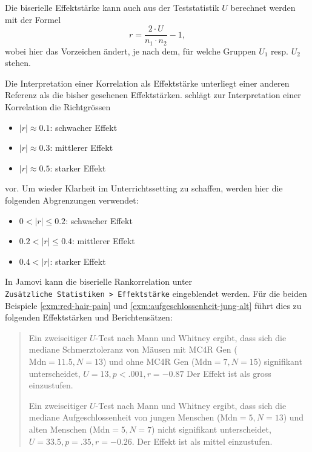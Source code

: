 \documentclass[
]{book}
\providecommand{\tightlist}{%
  \setlength{\itemsep}{0pt}\setlength{\parskip}{0pt}}
\theoremstyle{definition}
\theoremstyle{definition}
\theoremstyle{definition}
\theoremstyle{definition}
\theoremstyle{remark}
\begin{document}
Die biserielle Effektstärke kann auch aus der Teststatistik \(U\)
berechnet werden mit der Formel \[r = \frac{2\cdot U}{n_1\cdot n_2}-1,\]
wobei hier das Vorzeichen ändert, je nach dem, für welche Gruppen \(U_1\)
resp. \(U_2\) stehen.

Die Interpretation einer Korrelation als Effektstärke unterliegt einer
anderen Referenz als die bisher gesehenen Effektstärken. \citet{cohen1988}
schlägt zur Interpretation einer Korrelation die Richtgrössen

\begin{itemize}
\tightlist
\item
  \(|r| \approx 0.1\): schwacher Effekt
\item
  \(|r| \approx 0.3\): mittlerer Effekt
\item
  \(|r| \approx 0.5\): starker Effekt
\end{itemize}

vor. Um wieder Klarheit im Unterrichtssetting zu schaffen, werden hier
die folgenden Abgrenzungen verwendet:

\begin{itemize}
\tightlist
\item
  \(0 < |r| \leq 0.2\): schwacher Effekt
\item
  \(0.2 < |r| \leq 0.4\): mittlerer Effekt
\item
  \(0.4 < |r|\): starker Effekt
\end{itemize}

In Jamovi kann die biserielle Rankorrelation unter
\texttt{Zusätzliche\ Statistiken\ \textgreater{}\ Effektstärke} eingeblendet werden. Für die
beiden Beispiele \ref{exm:red-hair-pain} und
\ref{exm:aufgeschlossenheit-jung-alt} führt dies zu folgenden
Effektstärken und Berichtensätzen:

\begin{quote}
Ein zweiseitiger \(U\)-Test nach Mann und Whitney ergibt, dass sich die
mediane Schmerztoleranz von Mäusen mit MC4R Gen
(\(\text{Mdn}= 11.5, N =13\)) und ohne MC4R Gen (\(\text{Mdn}=7, N = 15\))
signifikant unterscheidet, \(U = 13, p < .001, r = -0.87\) Der Effekt
ist als gross einzustufen.

Ein zweiseitiger \(U\)-Test nach Mann und Whitney ergibt, dass sich die
mediane Aufgeschlossenheit von jungen Menschen
(\(\text{Mdn}= 5, N =13\)) und alten Menschen (\(\text{Mdn}=5, N = 7\))
nicht signifikant unterscheidet, \(U = 33.5, p = .35, r = -0.26\). Der
Effekt ist als mittel einzustufen.
\end{quote}
\end{document}
